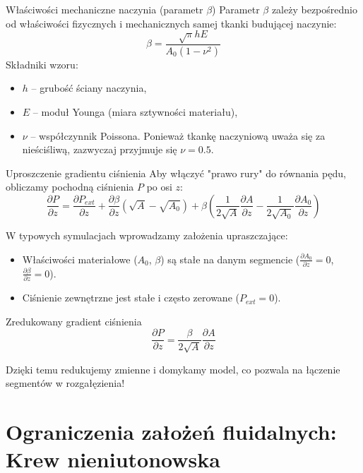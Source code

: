 \documentclass[aspectratio=169]{beamer}
\begin{document}
\begin{frame}{Właściwości mechaniczne naczynia (parametr $\beta$)}
    Parametr $\beta$ zależy bezpośrednio od właściwości fizycznych i mechanicznych samej tkanki budującej naczynie:
    $$\beta = \frac{\sqrt{\pi} h E}{A_0 (1-\nu^2)}$$
    \vspace{0.2cm}
    Składniki wzoru:
    \begin{itemize}
        \item $h$ -- grubość ściany naczynia,
        \item $E$ -- moduł Younga (miara sztywności materiału),
        \item $\nu$ -- współczynnik Poissona. Ponieważ tkankę naczyniową uważa się za nieściśliwą, zazwyczaj przyjmuje się $\nu = 0.5$.
    \end{itemize}
\end{frame}

\begin{frame}{Uproszczenie gradientu ciśnienia}
    Aby włączyć "prawo rury" do równania pędu, obliczamy pochodną ciśnienia $P$ po osi $z$:
    $$\frac{\partial P}{\partial z} = \frac{\partial P_{ext}}{\partial z} + \frac{\partial \beta}{\partial z}(\sqrt{A} - \sqrt{A_0}) + \beta\left(\frac{1}{2\sqrt{A}}\frac{\partial A}{\partial z} - \frac{1}{2\sqrt{A_0}}\frac{\partial A_0}{\partial z}\right)$$

    W typowych symulacjach wprowadzamy założenia upraszczające:
    \begin{itemize}
        \item Właściwości materiałowe ($A_0$, $\beta$) są stałe na danym segmencie ($\frac{\partial A_0}{\partial z} = 0$, $\frac{\partial \beta}{\partial z} = 0$).
        \item Ciśnienie zewnętrzne jest stałe i często zerowane ($P_{ext} = 0$).
    \end{itemize}
    \begin{block}{Zredukowany gradient ciśnienia}
        $$\frac{\partial P}{\partial z} = \frac{\beta}{2\sqrt{A}}\frac{\partial A}{\partial z}$$
    \end{block}
    Dzięki temu redukujemy zmienne i domykamy model, co pozwala na łączenie segmentów w rozgałęzienia!
\end{frame}

\section{Ograniczenia założeń fluidalnych: Krew nieniutonowska}
\end{document}
